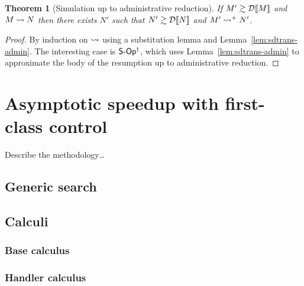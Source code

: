 \documentclass[12pt,phd,lfcs,twoside,openright,logo,leftchapter,normalheadings]{infthesis}
\theoremstyle{plain}
\newtheorem{theorem}{Theorem}[chapter]
\theoremstyle{definition}
\begin{document}
\begin{theorem}[Simulation up to administrative reduction]
If $M' \gtrsim \mathcal{D}\llbracket M \rrbracket$ and $M \leadsto N$ then there exists
$N'$ such that $N' \gtrsim \mathcal{D}\llbracket N \rrbracket$ and $M' \leadsto^+ N'$.
\end{theorem}
%
\begin{proof}
By induction on $\leadsto$ using a substitution lemma and
Lemma~\ref{lem:sdtrans-admin}. The interesting case is
$\mathsf{S\textrm{-}Op^\dagger}$, which uses Lemma~\ref{lem:sdtrans-admin} to
approximate the body of the resumption up to administrative reduction.
\end{proof}



\chapter{Asymptotic speedup with first-class control}
\label{ch:handlers-efficiency}
Describe the methodology\dots
\section{Generic search}
\section{Calculi}
\subsection{Base calculus}
\subsection{Handler calculus}
\end{document}
